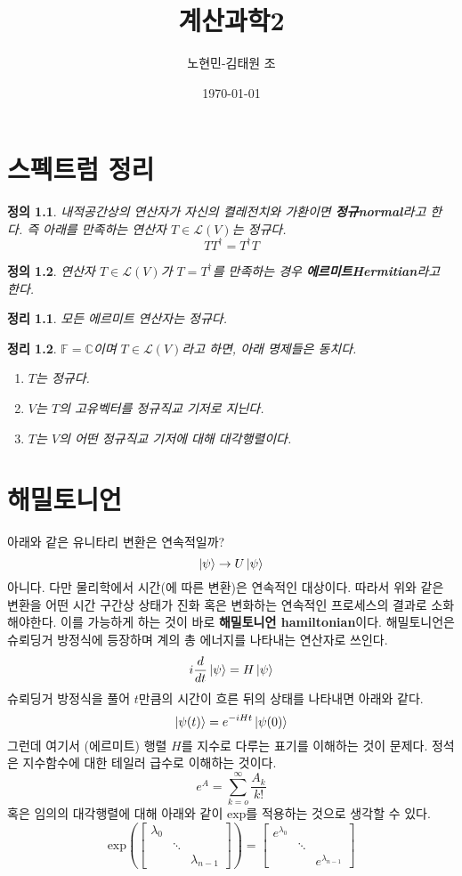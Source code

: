 \documentclass[a4paper,atbegshi,chapter,itemph,]{oblivoir}
\title{계산과학2}
\author{노현민-김태원 조}
\date{\today}
\newtheorem{defn}{정의}[chapter]
\newtheorem{theo}{정리}[chapter]
\begin{document}
\maketitle\pagestyle{empty}\newpage
\tableofcontents
\chapter{스펙트럼 정리}
\begin{defn}\normalfont
  내적공간상의 연산자가 자신의 켤레전치와 가환이면 \textbf{정규\tiny normal}라고
  한다. 즉 아래를 만족하는 연산자 $T\in\mathcal{L}(V)$는 정규다.
  \[
    TT^{\dagger}=T^{\dagger}T
  \]
\end{defn}
\begin{defn}\normalfont
  연산자 $T\in\mathcal{L}(V)$가 $T=T^{\dagger}$를 만족하는 경우 
  \textbf{에르미트\tiny Hermitian}라고 한다.
\end{defn}
\begin{theo}\normalfont
  모든 에르미트 연산자는 정규다.
\end{theo}
\begin{theo}\normalfont
  $\mathbb{F}=\mathbb{C}$이며 $T\in\mathcal{L}(V)$라고 하면, 아래
  명제들은 동치다.
  \begin{enumerate}[label=(\alph*)]
    \item $T$는 정규다.
    \item $V$는 $T$의 고유벡터를 정규직교 기저로 지닌다. 
    \item $T$는 $V$의 어떤 정규직교 기저에 대해 대각행렬이다.
  \end{enumerate}
\end{theo}
\chapter{해밀토니언}
아래와 같은 유니타리 변환은 연속적일까?
\[
  \ket{\psi} \rightarrow U\ket{\psi}
\]
아니다. 다만 물리학에서 시간(에 따른 변환)은 연속적인 대상이다. 따라서 위와
같은 변환을 어떤 시간 구간상 상태가 진화 혹은 변화하는 연속적인 프로세스의
결과로 소화해야한다. 이를 가능하게 하는 것이 바로 \textbf{해밀토니언\tiny
hamiltonian}이다. 해밀토니언은 슈뢰딩거 방정식에 등장하며 계의 총 에너지를
나타내는 연산자로 쓰인다. 
\[
  i\frac{d}{dt}\ket{\psi} = H\ket{\psi}
\]
슈뢰딩거 방정식을 풀어 $t$만큼의 시간이 흐른 뒤의 상태를 나타내면 아래와 같다.
\[
  \ket{\psi(t)} = e^{-iHt}\ket{\psi(0)}
\]
그런데 여기서 (에르미트) 행렬 $H$를 지수로 다루는 표기를 이해하는 것이 문제다.
정석은 지수함수에 대한 테일러 급수로 이해하는 것이다.
\[
  e^A=\sum_{k=o}^{\infty}\frac{A_k}{k!}
\]
혹은 임의의 대각행렬에 대해 아래와 같이 $\textrm{exp}$를 적용하는 것으로 생각할
수 있다.
\[
  \textrm{exp}\left(\begin{bmatrix}\lambda_0&&\\&\ddots&\\&&\lambda_{n-1}\end{bmatrix}\right) =\begin{bmatrix}e^{\lambda_0}&&\\&\ddots&\\&&e^{\lambda_{n-1}}\end{bmatrix}
\]
\end{document}
